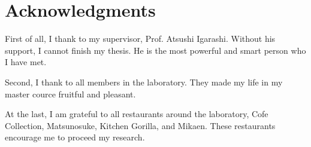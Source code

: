 \section*{Acknowledgments}
First of all, I thank to my supervisor, Prof. Atsushi Igarashi.  Without his
support, I cannot finish my thesis.  He is the most powerful and smart person
who I have met.

Second, I thank to all members in the laboratory. They made my life in my
master cource fruitful and pleasant.

At the last, I am grateful to all restaurants around the laboratory, Cofe
Collection, Matsunosuke, Kitchen Gorilla, and Mikaen. These restaurants
encourage me to proceed my research.

